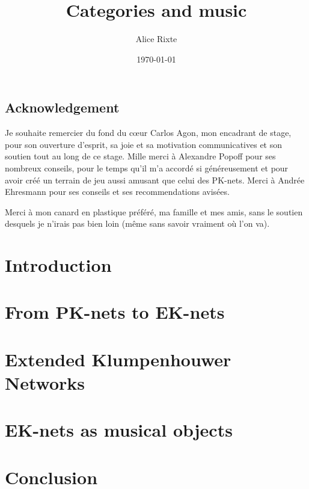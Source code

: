 \documentclass{report}
\begin{document}

\title{Categories and music}
\author{Alice Rixte}
\date{\today}
\maketitle %

\section*{Acknowledgement}
Je souhaite remercier du fond du cœur Carlos Agon, mon encadrant de stage, pour son ouverture d'esprit, sa joie et sa motivation communicatives et son soutien tout au long de ce stage. Mille merci à Alexandre Popoff pour ses nombreux conseils, pour le temps qu'il m'a accordé si généreusement et pour avoir créé un terrain de jeu aussi amusant que celui des PK-nets. Merci à Andrée Ehresmann pour ses conseils et ses recommendations avisées.

Merci à mon canard en plastique préféré, ma famille et mes amis, sans le soutien desquels je n'irais pas bien loin (même sans savoir vraiment où l'on va).


\tableofcontents


\chapter{Introduction}



\chapter{From PK-nets to EK-nets}


\chapter{Extended Klumpenhouwer Networks}


\chapter{EK-nets as musical objects}


%



\chapter{Conclusion}

%

\printnomenclature[2cm]

\newpage


\end{document}
